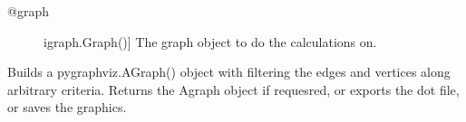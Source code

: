 \documentclass[letterpaper,10pt,english]{sphinxmanual}
\begin{document}
\begin{fulllineitems}
\begin{fulllineitems}
\begin{description}
\item[{@graph}] \leavevmode{[}igraph.Graph(){]}
The graph object to do the calculations on.

\end{description}

\end{fulllineitems}


\begin{fulllineitems}
\label{\detokenize{main:pypath.main.PyPath.export_dot}}
Builds a pygraphviz.AGraph() object with filtering the edges
and vertices along arbitrary criteria.
Returns the Agraph object if requesred, or exports the dot
file, or saves the graphics.


\end{fulllineitems}
\end{fulllineitems}
\end{document}
